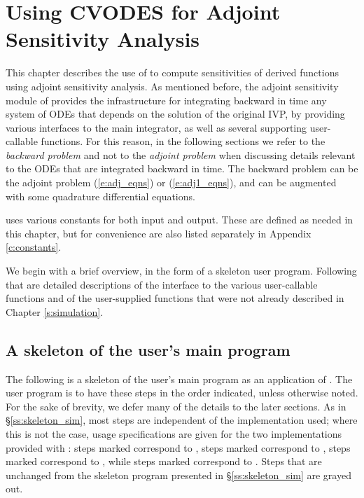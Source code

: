 \chapter{Using CVODES for Adjoint Sensitivity Analysis}\label{s:adjoint}

This chapter describes the use of {\cvodes} to compute sensitivities of derived 
functions using adjoint sensitivity analysis. As mentioned before, the adjoint
sensitivity module of {\cvodes} provides the infrastructure for integrating
backward in time any system of ODEs that depends on the solution of the original
IVP, by providing various interfaces to the main {\cvodes} integrator, as well 
as several supporting user-callable functions. For this reason, in the following
sections we refer to the {\em backward problem} and not to the 
{\em adjoint problem} when discussing details relevant to the ODEs that
are integrated backward in  time. The backward problem can be the adjoint problem
(\ref{e:adj_eqns}) or (\ref{e:adj1_eqns}), and
can be augmented with some quadrature differential equations.

{\cvodes} uses various constants for both input and output.  These are
defined as needed in this chapter, but for convenience are also listed
separately in Appendix \ref{c:constants}.

We begin with a brief overview, in the form of a skeleton user program.
Following that are detailed descriptions of the interface to the
various user-callable functions and of the user-supplied functions that were not
already described in Chapter \ref{s:simulation}.

\section{A skeleton of the user's main program}
\label{ss:skeleton_adj}

The following is a skeleton of the user's main program as an application of
{\cvodes}. The user program is to have these steps in the order indicated, 
unless otherwise noted. For the sake of brevity, we defer many of the details to 
the later sections.
As in \S\ref{ss:skeleton_sim}, most steps are independent of the {\nvector}
implementation used; where this is not the case, usage specifications are given for the
two implementations provided with {\cvodes}: steps marked {\p} correspond to 
{\nvecp}, steps marked {\omp} correspond to {\nvecopenmp}, steps
marked {\pt} correspond to {\nvecpthreads}, while steps marked {\s}
correspond to {\nvecs}. 
Steps that are unchanged from the skeleton program presented in
\S\ref{ss:skeleton_sim} are grayed out.

